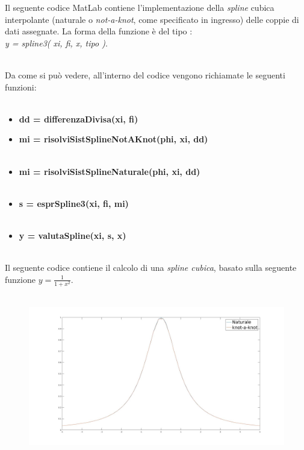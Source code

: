 Il seguente codice MatLab contiene l'implementazione della \textit{spline} cubica interpolante (naturale o \textit{not-a-knot}, come specificato in ingresso) delle coppie di dati assegnate. La forma della funzione è del tipo :\\ \textit{y = spline3( xi, fi, x, tipo )}.\\\
	
Da come si può vedere, all'interno del codice vengono richiamate le seguenti funzioni:\\\ 
	\begin{itemize}
		\item \textbf{dd = differenzaDivisa(xi, fi)}
	    	
		\item \textbf{mi = risolviSistSplineNotAKnot(phi, xi, dd)}\\\
	    	
		\item \textbf{mi = risolviSistSplineNaturale(phi, xi, dd)}\\\
	      	
		\item \textbf{s = esprSpline3(xi, fi, mi)}\\\
	    	
		\item \textbf{y = valutaSpline(xi, s, x)}\\\
	      	
	\end{itemize}
Il seguente codice contiene il calcolo di una \textit{spline cubica}, basato sulla seguente funzione $y = \frac{1}{1+x^2}$.\\\
	
	\begin{figure}[H]
		\includegraphics[width=\textwidth]{Plot/Cap_4_Es_5}
	\end{figure}
